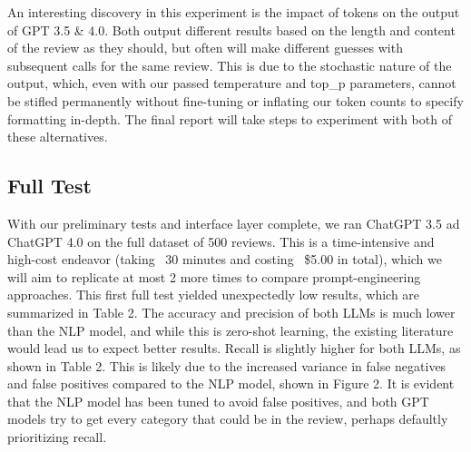 \documentclass[12pt,a4paper]{article}
\begin{document}
\noindent An interesting discovery in this experiment is the impact of tokens on the output of GPT 3.5 \& 4.0. Both output different results based on the length and content of the review as they should, but often will make different guesses with subsequent calls for the same review. This is due to the stochastic nature of the output, which, even with our passed temperature and top\_p parameters, cannot be stifled permanently without fine-tuning or inflating our token counts to specify formatting in-depth. The final report will take steps to experiment with both of these alternatives. 


\subsection{Full Test}

\noindent With our preliminary tests and interface layer complete, we ran ChatGPT 3.5 ad ChatGPT 4.0 on the full dataset of 500 reviews. This is a time-intensive and high-cost endeavor (taking ~30 minutes and costing ~\$5.00 in total), which we will aim to replicate at most 2 more times to compare prompt-engineering approaches. This first full test yielded unexpectedly low results, which are summarized in Table 2. The accuracy and precision of both LLMs is much lower than the NLP model, and while this is zero-shot learning, the existing literature would lead us to expect better results. Recall is slightly higher for both LLMs, as shown in Table 2. This is likely due to the increased variance in false negatives and false positives compared to the NLP model, shown in Figure 2. It is evident that the NLP model has been tuned to avoid false positives, and both GPT models try to get every category that could be in the review, perhaps defaultly prioritizing recall. \\

\begin{table}[htb]
    \caption{Model Performance Comparison\label{tab2}}
    \centering
    \label{tab:model_performance}
\end{table}
\end{document}
